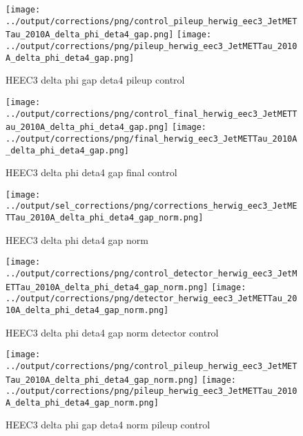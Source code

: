 \documentclass[11pt]{book}
\begin{document}
\begin{figure}[ht]
\centering
\texttt{[image: ../output/corrections/png/control\_pileup\_herwig\_eec3\_JetMETTau\_2010A\_delta\_phi\_deta4\_gap.png]}
\texttt{[image: ../output/corrections/png/pileup\_herwig\_eec3\_JetMETTau\_2010A\_delta\_phi\_deta4\_gap.png]}
\caption{HEEC3 delta phi gap deta4 pileup control}
\label{fig:HEEC3_JetMETTau_2010A_delta_phi_deta4_gap_pileup_control}
\end{figure}


\begin{figure}[ht]
\centering
\texttt{[image: ../output/corrections/png/control\_final\_herwig\_eec3\_JetMETTau\_2010A\_delta\_phi\_deta4\_gap.png]}
\texttt{[image: ../output/corrections/png/final\_herwig\_eec3\_JetMETTau\_2010A\_delta\_phi\_deta4\_gap.png]}
\caption{HEEC3 delta phi deta4 gap final control}
\label{fig:HEEC3_JetMETTau_2010A_delta_phi_deta4_gap_final_control}
\end{figure}


\begin{figure}[ht]
\centering
\texttt{[image: ../output/sel\_corrections/png/corrections\_herwig\_eec3\_JetMETTau\_2010A\_delta\_phi\_deta4\_gap\_norm.png]}
\caption{HEEC3 delta phi deta4 gap norm}
\label{fig:HEEC3_JetMETTau_2010A_delta_phi_deta4_gap_norm}
\end{figure}


\begin{figure}[ht]
\centering
\texttt{[image: ../output/corrections/png/control\_detector\_herwig\_eec3\_JetMETTau\_2010A\_delta\_phi\_deta4\_gap\_norm.png]}
\texttt{[image: ../output/corrections/png/detector\_herwig\_eec3\_JetMETTau\_2010A\_delta\_phi\_deta4\_gap\_norm.png]}
\caption{HEEC3 delta phi deta4 gap norm detector control}
\label{fig:HEEC3_JetMETTau_2010A_delta_phi_deta4_gap_norm_detector_control}
\end{figure}

\begin{figure}[ht]
\centering
\texttt{[image: ../output/corrections/png/control\_pileup\_herwig\_eec3\_JetMETTau\_2010A\_delta\_phi\_deta4\_gap\_norm.png]}
\texttt{[image: ../output/corrections/png/pileup\_herwig\_eec3\_JetMETTau\_2010A\_delta\_phi\_deta4\_gap\_norm.png]}
\caption{HEEC3 delta phi gap deta4 norm pileup control}
\label{fig:HEEC3_JetMETTau_2010A_delta_phi_deta4_gap_norm_pileup_control}
\end{figure}
\end{document}
